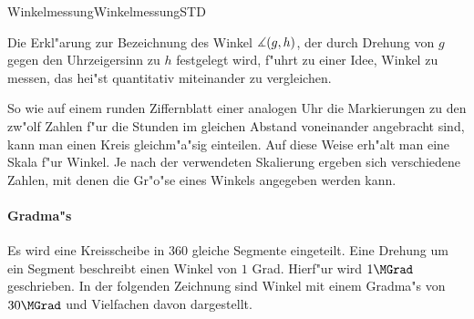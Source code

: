 \begin{MXContent}{Winkelmessung}{Winkelmessung}{STD}


Die Erkl"arung zur Bezeichnung des Winkel $\measuredangle(g,h)$, der durch
Drehung von $g$ gegen den Uhrzeigersinn zu $h$ festgelegt wird, f"uhrt 
zu einer Idee, Winkel zu messen, das hei"st quantitativ miteinander zu 
vergleichen.

So wie auf einem runden Ziffernblatt einer analogen Uhr die Markierungen zu den
zw"olf Zahlen f"ur die Stunden im gleichen Abstand voneinander angebracht sind,
kann man einen Kreis gleichm"a"sig einteilen. Auf diese Weise erh"alt man eine
Skala f"ur Winkel. Je nach der verwendeten Skalierung ergeben sich 
verschiedene Zahlen, mit denen die Gr"o"se eines Winkels angegeben werden kann.

\paragraph{Gradma"s}

Es wird eine Kreisscheibe in $360$ gleiche Segmente eingeteilt. Eine Drehung
um ein Segment beschreibt einen Winkel von $1$ Grad. Hierf"ur wird $1\MGrad$ 
geschrieben. In der folgenden Zeichnung sind Winkel mit einem Gradma"s von 
$30\MGrad$ und Vielfachen davon dargestellt.

\begin{center}
\end{center}


\end{MXContent}
